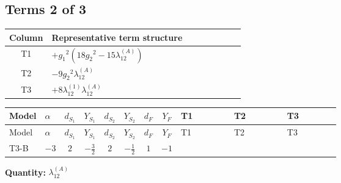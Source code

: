 \documentclass[8pt]{article}
\begin{document}
\begin{landscape}
\subsection*{Terms 2 of 3}
\begin{center}
\begin{tabular}{@{}c >{\raggedright\arraybackslash}p{0.82\linewidth}@{}}
\toprule
Column & Representative term structure \\
\midrule
T1 & \(\displaystyle +{g_1}^2 \left(18 {g_2}^2-15 {\lambda_{12}^{(A)}}\right)\) \\
\midrule
T2 & \(\displaystyle -9 {g_2}^2 {\lambda_{12}^{(A)}}\) \\
\midrule
T3 & \(\displaystyle +8 {\lambda_{12}^{(1)}} {\lambda_{12}^{(A)}}\) \\
\midrule
\bottomrule
\end{tabular}
\end{center}
\smallskip
\tiny
\begin{longtable}{@{}llcccccc >{\raggedright\arraybackslash}p{0.21\linewidth} >{\raggedright\arraybackslash}p{0.21\linewidth} >{\raggedright\arraybackslash}p{0.21\linewidth}@{}}
\toprule
Model & $\alpha$ & $d_{S_1}$ & $Y_{S_1}$ & $d_{S_2}$ & $Y_{S_2}$ & $d_F$ & $Y_F$ & T1 & T2 & T3 \\
\midrule
\endfirsthead
\toprule
Model & $\alpha$ & $d_{S_1}$ & $Y_{S_1}$ & $d_{S_2}$ & $Y_{S_2}$ & $d_F$ & $Y_F$ & T1 & T2 & T3 \\
\midrule
\endhead
T3-B & $-3$ & $2$ & $-\frac{3}{2}$ & $2$ & $-\frac{1}{2}$ & $1$ & $-1$ & \scriptsize\adjustbox{max width=\linewidth}{$\begin{gathered} +{g_1}^2 \left(18 {g_2}^2-15 {\lambda_{12}^{(A)}}\right)\end{gathered}$} & \scriptsize\adjustbox{max width=\linewidth}{$\begin{gathered} -9 {g_2}^2 {\lambda_{12}^{(A)}}\end{gathered}$} & \scriptsize\adjustbox{max width=\linewidth}{$\begin{gathered} +8 {\lambda_{12}^{(1)}} {\lambda_{12}^{(A)}}\end{gathered}$} \\
\midrule
\bottomrule
\end{longtable}
\clearpage
\noindent\textbf{Quantity: }$\lambda_{12}^{(A)}$\par\smallskip

\end{landscape}
\end{document}
